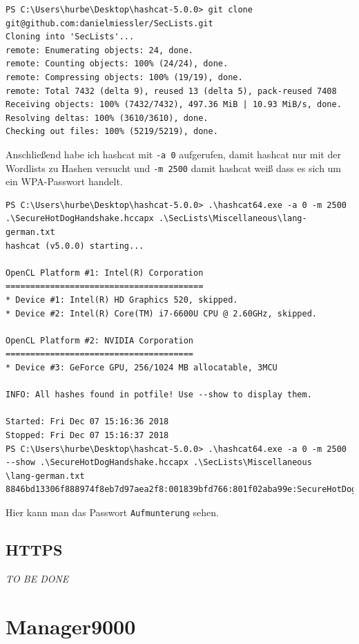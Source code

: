 \documentclass[12pt,a4paper,titlepage,oneside]{scrartcl}
\newcommand{\lang}{de}
\begin{document}
\begin{lstlisting}
PS C:\Users\hurbe\Desktop\hashcat-5.0.0> git clone git@github.com:danielmiessler/SecLists.git
Cloning into 'SecLists'...
remote: Enumerating objects: 24, done.
remote: Counting objects: 100% (24/24), done.
remote: Compressing objects: 100% (19/19), done.
remote: Total 7432 (delta 9), reused 13 (delta 5), pack-reused 7408
Receiving objects: 100% (7432/7432), 497.36 MiB | 10.93 MiB/s, done.
Resolving deltas: 100% (3610/3610), done.
Checking out files: 100% (5219/5219), done.
\end{lstlisting}

Anschließend habe ich hashcat mit \lstinline{-a 0} aufgerufen, damit hashcat nur mit der Wordlists zu Hashen versucht und \lstinline{-m 2500} damit hashcat weiß dass es sich um ein WPA-Passwort handelt.

\begin{lstlisting}
PS C:\Users\hurbe\Desktop\hashcat-5.0.0> .\hashcat64.exe -a 0 -m 2500 .\SecureHotDogHandshake.hccapx .\SecLists\Miscellaneous\lang-german.txt
hashcat (v5.0.0) starting...

OpenCL Platform #1: Intel(R) Corporation
========================================
* Device #1: Intel(R) HD Graphics 520, skipped.
* Device #2: Intel(R) Core(TM) i7-6600U CPU @ 2.60GHz, skipped.

OpenCL Platform #2: NVIDIA Corporation
======================================
* Device #3: GeForce GPU, 256/1024 MB allocatable, 3MCU

INFO: All hashes found in potfile! Use --show to display them.

Started: Fri Dec 07 15:16:36 2018
Stopped: Fri Dec 07 15:16:37 2018
PS C:\Users\hurbe\Desktop\hashcat-5.0.0> .\hashcat64.exe -a 0 -m 2500 --show .\SecureHotDogHandshake.hccapx .\SecLists\Miscellaneous
\lang-german.txt
8846bd13306f888974f8eb7d97aea2f8:001839bfd766:801f02aba99e:SecureHotDog:Aufmunterung
\end{lstlisting}

Hier kann man das Passwort \lstinline{Aufmunterung} sehen.

\subsection{HTTPS}
\emph{TO BE DONE}

\section{Manager9000}
\end{document}
